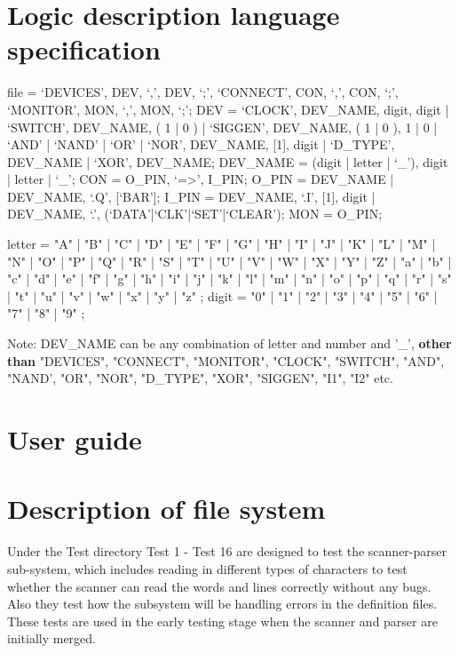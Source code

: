 \documentclass[12pt]{article}
\newenvironment{metaverbatim}{\verbatim}{\endverbatim}
\begin{document}
\newpage
\section{Logic description language specification}
\begin{metaverbatim}
file =  `DEVICES', DEV, {`,', DEV}, `;', `CONNECT', CON, {`,', CON}, `;',
        `MONITOR', MON, {`,', MON}, `;';
DEV  =  `CLOCK', DEV_NAME, digit, {digit} |
        `SWITCH', DEV_NAME, ( 1 | 0 ) |
        `SIGGEN', DEV_NAME, ( 1 | 0 ), { 1 | 0 } |
        `AND' | `NAND' | `OR' | `NOR', DEV_NAME, [1], digit	|
        `D_TYPE', DEV_NAME |
        `XOR', DEV_NAME;
DEV_NAME  =	 (digit | letter | `_'), {digit | letter | `_'};
CON       =  O_PIN, `=>', I_PIN;
O_PIN     =  DEV_NAME |
             DEV_NAME, `.Q', [`BAR'];
I_PIN     =  DEV_NAME, `.I', [1], digit	|
             DEV_NAME, `.', (`DATA'|`CLK'|`SET'|`CLEAR');
MON       =  O_PIN;

letter = "A" | "B" | "C" | "D" | "E" | "F" | "G"
       | "H" | "I" | "J" | "K" | "L" | "M" | "N"
       | "O" | "P" | "Q" | "R" | "S" | "T" | "U"
       | "V" | "W" | "X" | "Y" | "Z" | "a" | "b"
       | "c" | "d" | "e" | "f" | "g" | "h" | "i"
       | "j" | "k" | "l" | "m" | "n" | "o" | "p"
       | "q" | "r" | "s" | "t" | "u" | "v" | "w"
       | "x" | "y" | "z" ;
digit = "0" | "1" | "2" | "3" | "4" | "5" | "6" | "7" | "8" | "9" ;

\end{metaverbatim}

\vspace{20mm}
Note: DEV\_NAME can be any combination of letter and number and '\_', \textbf{other than} "DEVICES", "CONNECT", "MONITOR", "CLOCK", "SWITCH", "AND", "NAND', "OR", "NOR", "D\_TYPE", "XOR", "SIGGEN", "I1", "I2" etc.
\newpage
\section{User guide}

\newpage
\section{Description of file system}
Under the Test directory
Test 1 - Test 16 are designed to test the scanner-parser sub-system, which includes reading in different types of characters 
to test whether the scanner can read the words and lines correctly without any bugs. Also they test how the subsystem will be 
handling errors in the definition files. These tests are used in the early testing stage when the scanner and parser are 
initially merged.\\
\end{document}
